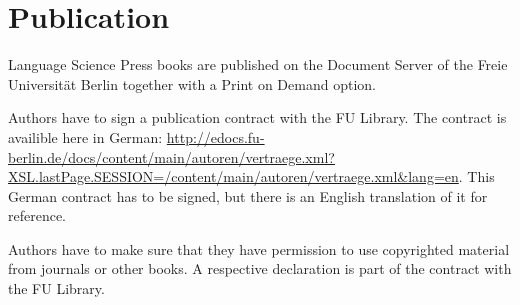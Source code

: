 \chapter{Publication}

Language Science Press books are published on the Document Server of the Freie Universität Berlin
together with a Print on Demand option.



Authors have to sign a publication contract with the FU Library. The contract is availible here in
German:
\url{http://edocs.fu-berlin.de/docs/content/main/autoren/vertraege.xml?XSL.lastPage.SESSION=/content/main/autoren/vertraege.xml&lang=en}. This
German contract has to be signed, but there is an English translation of it for reference.


Authors have to make sure that they have permission to use copyrighted material from journals or
other books. A respective declaration is part of the contract with the FU Library.

